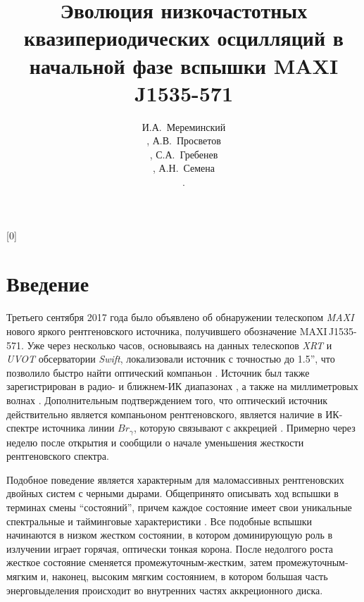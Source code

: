 \documentclass{pazhb}
\def\maxisrc{MAXI\,J1535-571}
\def\maxi{{\em MAXI}}
\begin{document}
[0]

\title{Эволюция низкочастотных квазипериодических осцилляций в начальной фазе вспышки MAXI J1535-571 }

\author{ 
И.А.~Мереминский\address{1}, А.В.~Просветов\address{1},
С.А.~Гребенев\address{1}, А.Н.~Семена\address{1}.
}




\begin{abstract}

  
  \keywords{}

\end{abstract}




\section{Введение}
Третьего сентября 2017 года \cite{negoro17ATel10699} было объявлено об обнаружении телескопом \maxi\, \citep{matsuoka09,negoro16} нового яркого рентгеновского источника, получившего обозначение \maxisrc. Уже через несколько часов, основываясь на данных телескопов {\em XRT} и {\em UVOT} обсерватории {\em Swift}, \cite{kennea17ATel10700} локализовали источник с точностью до 1.5'', что позволило быстро найти оптический компаньон \citep{scaringi17ATel10702}. Источник был также зарегистрирован в радио- \citep{russel17ATel10711} и ближнем-ИК диапазонах \citep{dincer17ATel10716}, а также на миллиметровых волнах \citep{tetarenko17ATel10745}. Дополнительным подтверждением того, что оптический источник действительно является компаньоном рентгеновского, является наличие в ИК-спектре источника линии $Br_{\gamma}$, которую связывают с аккрецией \citep{bandyopadhyay97}. Примерно через неделю после открытия \cite{nakahira17ATel10729} и \cite{kennea17ATel10731} сообщили о начале уменьшения жесткости рентгеновского спектра. 

Подобное поведение является характерным для маломассивных рентгеновских двойных систем с черными дырами. Общепринято описывать ход вспышки в терминах смены ``состояний'', причем каждое состояние имеет свои уникальные спектральные и тайминговые характеристики \citep[подробнее см.][и многие другие]{tanaka96,grebenev97,remillard06,belloni10}. Все подобные вспышки начинаются в низком жестком состоянии, в котором доминирующую роль в излучении играет горячая, оптически тонкая корона. После недолгого роста жесткое состояние сменяется промежуточным-жестким, затем промежуточным-мягким и, наконец, высоким мягким состоянием, в котором большая часть энерговыделения происходит во внутренних частях аккреционного диска. 
\end{document}
